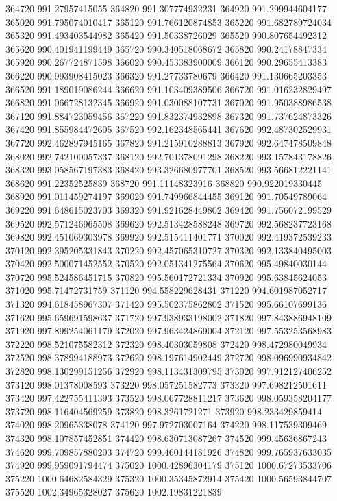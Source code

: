 {364720 991.27957415055
364820 991.307774932231
364920 991.299944604177
365020 991.795074010417
365120 991.766120874853
365220 991.682789724034
365320 991.493403544982
365420 991.50338726029
365520 990.807654492312
365620 990.401941199449
365720 990.340518068672
365820 990.24178847334
365920 990.267724871598
366020 990.453383900009
366120 990.29655413383
366220 990.993908415023
366320 991.27733780679
366420 991.130665203353
366520 991.189019086244
366620 991.103409389506
366720 991.016232829497
366820 991.066728132345
366920 991.030088107731
367020 991.950388986538
367120 991.884723059456
367220 991.832374932898
367320 991.737624873326
367420 991.855984472605
367520 992.162348565441
367620 992.487302529931
367720 992.462897945165
367820 991.215910288813
367920 992.647478509848
368020 992.742100057337
368120 992.701378091298
368220 993.157843178826
368320 993.058567197383
368420 993.326680977701
368520 993.566812221141
368620 991.22352525839
368720 991.11148323916
368820 990.922019330445
368920 991.011459274197
369020 991.749966844455
369120 991.70549789064
369220 991.648615023703
369320 991.921628449802
369420 991.756072199529
369520 992.571246965508
369620 992.513428588248
369720 992.568237723168
369820 992.451069303978
369920 992.515411401771
370020 992.419372539233
370120 992.395205331843
370220 992.457065310727
370320 992.133840495003
370420 992.500071452552
370520 992.051341275564
370620 995.49840030144
370720 995.524586451715
370820 995.560172721334
370920 995.63845624053
371020 995.71472731759
371120 994.558229628431
371220 994.601987052717
371320 994.618458967307
371420 995.502375862802
371520 995.66107699136
371620 995.659691598637
371720 997.938933198002
371820 997.843886948109
371920 997.899254061179
372020 997.963424869004
372120 997.553253568983
372220 998.521075582312
372320 998.40303059808
372420 998.472980049934
372520 998.378994188973
372620 998.197614902449
372720 998.096990934842
372820 998.130299151256
372920 998.113431309795
373020 997.912127406252
373120 998.01378008593
373220 998.057251582773
373320 997.698212501611
373420 997.422755411393
373520 998.067728811217
373620 998.059358204177
373720 998.116404569259
373820 998.3261721271
373920 998.233429859414
374020 998.20965338078
374120 997.972703007164
374220 998.117539309469
374320 998.107857452851
374420 998.630713087267
374520 999.45636867243
374620 999.709857880203
374720 999.460144181926
374820 999.765937633035
374920 999.959091794474
375020 1000.42896304179
375120 1000.67273533706
375220 1000.64682584329
375320 1000.35345872914
375420 1000.56593844707
375520 1002.34965328027
375620 1002.19831221839
}
